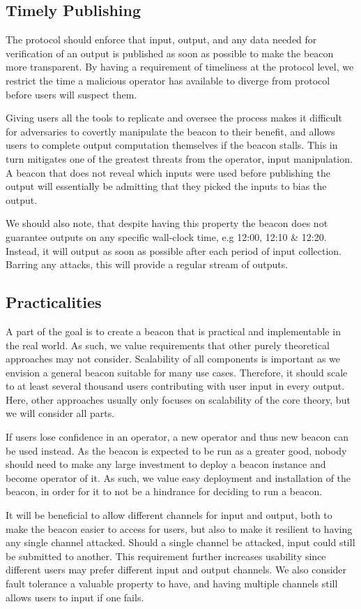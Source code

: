 \subsection{Timely Publishing}\label{sec:timely_publishing}
The protocol should enforce that input, output, and any data needed for verification of an output is published as soon as possible to make the beacon more transparent.
By having a requirement of timeliness at the protocol level, we restrict the time a malicious operator has available to diverge from protocol before users will suspect them.

Giving users all the tools to replicate and oversee the process makes it difficult for adversaries to covertly manipulate the beacon to their benefit, and allows users to complete output computation themselves if the beacon stalls.
This in turn mitigates one of the greatest threats from the operator, input manipulation.
A beacon that does not reveal which inputs were used before publishing the output will essentially be admitting that they picked the inputs to bias the output.

We should also note, that despite having this property the beacon does not guarantee outputs on any specific wall-clock time, e.g 12:00, 12:10 \& 12:20. Instead, it will output as soon as possible after each period of input collection. Barring any attacks, this will provide a regular stream of outputs.

\subsection{Practicalities}\label{sec:practical}
A part of the goal is to create a beacon that is practical and implementable in the real world.
As such, we value requirements that other purely theoretical approaches may not consider.
Scalability of all components is important as we envision a general beacon suitable for many use cases.
Therefore, it should scale to at least several thousand users contributing with user input in every output.
Here, other approaches usually only focuses on scalability of the core theory, but we will consider all parts.

If users lose confidence in an operator, a new operator and thus new beacon can be used instead.
As the beacon is expected to be run as a greater good, nobody should need to make any large investment to deploy a beacon instance and become operator of it.
As such, we value easy deployment and installation of the beacon, in order for it to not be a hindrance for deciding to run a beacon.

It will be beneficial to allow different channels for input and output, both to make the beacon easier to access for users, but also to make it resilient to having any single channel attacked.
Should a single channel be attacked, input could still be submitted to another.
This requirement further increases usability since different users may prefer different input and output channels.
We also consider fault tolerance a valuable property to have, and having multiple channels still allows users to input if one fails.
